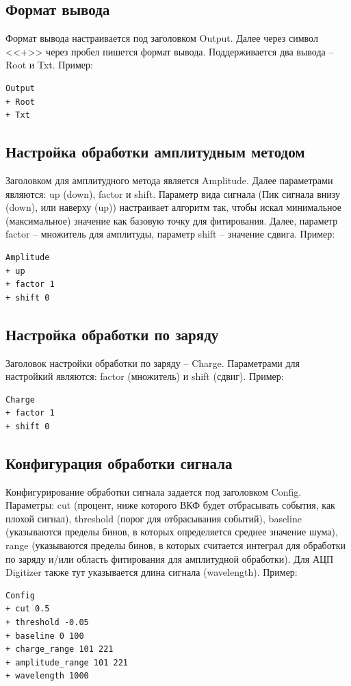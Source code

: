 \documentclass[12pt,a4paper,openany]{article}
\begin{document}
\subsection{Формат вывода}
Формат вывода настраивается под заголовком Output.
Далее через символ <<+>> через пробел пишется формат вывода. Поддерживается два вывода -- Root и Txt.
Пример:
\begin{lstlisting}
Output
+ Root
+ Txt
\end{lstlisting}

\subsection{Настройка обработки амплитудным методом}
Заголовком для амплитудного метода является Amplitude.
Далее параметрами являются: up (down), factor и shift.
Параметр вида сигнала (Пик сигнала внизу (down), или наверху (up)) настраивает алгоритм так, чтобы искал минимальное (максимальное) значение как базовую точку для фитирования.
Далее, параметр factor -- множитель для амплитуды, параметр shift -- значение сдвига.
Пример:
\begin{lstlisting}
Amplitude
+ up
+ factor 1
+ shift 0
\end{lstlisting}

\subsection{Настройка обработки по заряду}
Заголовок настройки обработки по заряду -- Charge.
Параметрами для настройкий являются: factor (множитель) и shift (сдвиг).
Пример:
\begin{lstlisting}
Charge
+ factor 1
+ shift 0
\end{lstlisting}

\subsection{Конфигурация обработки сигнала}
Конфигурирование обработки сигнала задается под заголовком Config.
Параметры: cut (процент, ниже которого ВКФ будет отбрасывать события, как плохой сигнал),
threshold (порог для отбрасывания событий),
baseline (указываются пределы бинов, в которых определяется среднее значение шума),
range (указываются пределы бинов, в которых считается интеграл для обработки по заряду и/или область фитирования для амплитудной обработки).
Для АЦП Digitizer также тут указывается длина сигнала (wavelength).
Пример:
\begin{lstlisting}
Config
+ cut 0.5
+ threshold -0.05
+ baseline 0 100
+ charge_range 101 221
+ amplitude_range 101 221
+ wavelength 1000
\end{lstlisting}
\end{document}
